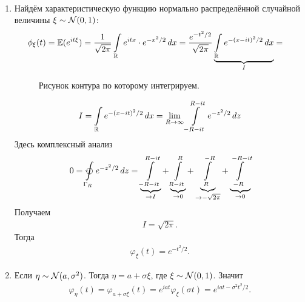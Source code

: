 \documentclass[../main.tex]{subfiles}
\begin{document}
\begin{exmpl}\
\begin{enumerate}
  \item Найдём характеристическую функцию нормально распределённой случайной величины $ \xi \sim \mathcal N(0,1) $:
   \begin{align*}
    \phi_\xi(t) &= \mathbb E (e^{it\xi} ) = \frac{1}{\sqrt{2\pi}} \int\limits_{\mathbb{R}} e^{itx}  \cdot e^{-x^{2} / 2}\,dx = \frac{e^{-t^{2} / 2}}{\sqrt{2\pi} } \underbrace{\int\limits_{\mathbb{R}} e^{-(x-it)^{2} / 2} \,dx}_{I} = 
   \end{align*}
\begin{figure}[ht]
    \centering
	\caption{Рисунок контура по которому интегрируем.}
    \label{fig:characteristic_function_normall}
\end{figure}
   \begin{align*}
	I = \int\limits_{\mathbb{R}} e^{-(x-it)^{2} / 2} \,dx = \lim_{R \to \infty} \int\limits_{-R-it}^{R-it} e^{-z^{2} / 2}\,dz
   \end{align*} Здесь комплексный анализ
   \begin{align*}
	0 = \varointctrclockwise \limits_{\Gamma_R}  e^{-z^{2} / 2}\,dz = \underbrace{\int\limits_{-R-it}^{R-it}}_{\to I}  + \underbrace{\int\limits_{R-it}^{R}}_{\to 0}  + \underbrace{\int\limits_{R}^{-R}}_{\to -\sqrt{2\pi}} + \underbrace{\int\limits_{-R}^{-R-it}}_{\to 0}
   \end{align*} Получаем
   \begin{align*}
    I = \sqrt{2\pi}.
   \end{align*} Тогда
   \begin{align*}
    \varphi_\xi(t) = e^{-t^{2} / 2}.
   \end{align*}
  \item Если $ \eta \sim \mathcal N(a, \sigma^{2}) $. Тогда $ \eta = a + \sigma \xi $, где $ \xi \sim \mathcal N(0,1) $. Значит
   \begin{align*}
    \varphi_\eta(t) = \varphi_{a + \sigma \xi}(t) = e^{iat} \varphi_\xi(\sigma t) = e^{iat - \sigma^{2}t^{2} / 2}.
   \end{align*}
 \end{enumerate}
\end{exmpl}
\end{document}

